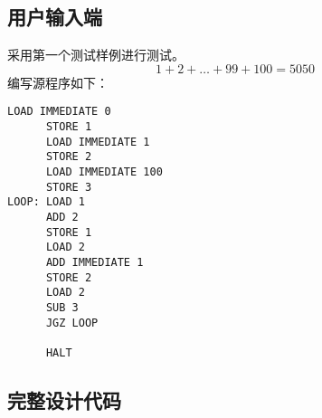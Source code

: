 \documentclass[lang=cn,a4paper,newtx]{elegantpaper}
\begin{document}
\subsection{用户输入端}
采用第一个测试样例进行测试。
$$
1+2+\dots +99 +100 =5050
$$
编写源程序如下：
\begin{lstlisting}[language=Assembly]
      LOAD IMMEDIATE 0 
      STORE 1
      LOAD IMMEDIATE 1
      STORE 2
      LOAD IMMEDIATE 100
      STORE 3
LOOP: LOAD 1
      ADD 2
      STORE 1
      LOAD 2
      ADD IMMEDIATE 1
      STORE 2
      LOAD 2
      SUB 3
      JGZ LOOP

      HALT
\end{lstlisting}
\nocite{FPGA-CPU}

\printbibliography
\newpage
\addappheadtotoc
\begin{appendices}
  \section{完整设计代码}
\end{appendices}
\end{document}
